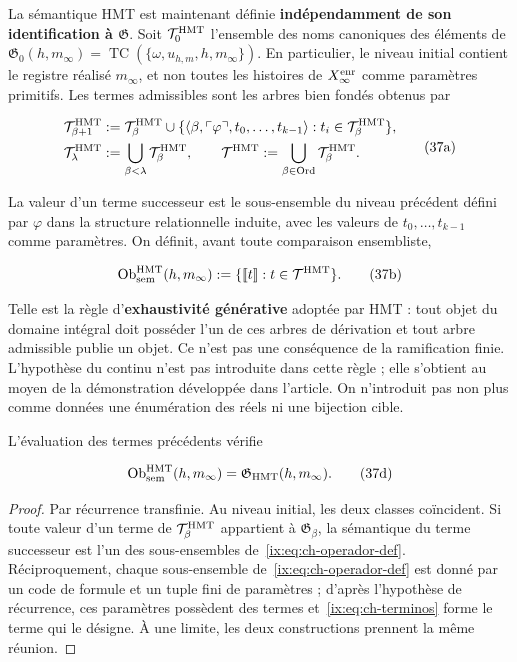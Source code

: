La sémantique HMT est maintenant définie \textbf{indépendamment de son identification à \(\mathfrak G\)}. Soit \(\mathcal T_0^{\rm HMT}\) l'ensemble des noms canoniques des éléments de \(\mathfrak G_0(h,m_\infty)=
\operatorname{TC}(\{\omega,u_{h,m},h,m_\infty\})\). En particulier, le niveau initial contient le registre réalisé \(m_\infty\), et non toutes les histoires de \(X_\infty^{\rm enr}\) comme paramètres primitifs. Les termes admissibles sont les arbres bien fondés obtenus par

\[
 \begin{aligned}
 \mathcal T^{\rm HMT}_{\beta+1}
 &:={\mathcal T}^{\rm HMT}_\beta\cup
 \{\langle\beta,\ulcorner\varphi\urcorner,
       t_0,\ldots,t_{k-1}\rangle:
       t_i\in\mathcal T^{\rm HMT}_\beta\},\\
 \mathcal T^{\rm HMT}_\lambda&:=
       \bigcup_{\beta<\lambda}\mathcal T^{\rm HMT}_\beta,
 \qquad
 \mathcal T^{\rm HMT}:=
       \bigcup_{\beta\in\operatorname{Ord}}\mathcal T^{\rm HMT}_\beta.
 \end{aligned}
\tag{37a}\label{ix:eq:ch-terminos}
\]

La valeur d’un terme successeur est le sous-ensemble du niveau précédent défini
par \(\varphi\) dans la structure relationnelle induite, avec les valeurs de
\(t_0,\ldots,t_{k-1}\) comme paramètres. On définit, avant toute
comparaison ensembliste,

\[
 \operatorname{Ob}_{\rm sem}^{\rm HMT}(h,m_\infty)
 :=\{\llbracket t\rrbracket:t\in\mathcal T^{\rm HMT}\}.
\tag{37b}\label{ix:eq:ch-objetos-semanticos}
\]

Telle est la règle d’\textbf{exhaustivité générative} adoptée par HMT : tout
objet du domaine intégral doit posséder l’un de ces arbres de dérivation et tout
arbre admissible publie un objet. Ce n’est pas une conséquence de la ramification
finie. L’hypothèse du continu n’est pas introduite dans cette règle ; elle s’obtient
au moyen de la démonstration développée dans l’article. On n’introduit pas non plus
comme données une énumération des réels ni une bijection cible.

\begin{theorem}
\label{ix:thm:ch-6a}
L’évaluation des
termes précédents vérifie

\[
 \operatorname{Ob}_{\rm sem}^{\rm HMT}(h,m_\infty)
 =\mathfrak G_{\rm HMT}(h,m_\infty).
\tag{37d}\label{ix:eq:ch-equivalencia-semantica}
\]

\end{theorem}
\begin{proof}
Par récurrence transfinie. Au niveau initial, les deux classes coïncident. Si toute valeur d'un terme de \(\mathcal T^{\rm HMT}_\beta\) appartient à \(\mathfrak G_\beta\), la sémantique du terme successeur est l'un des sous-ensembles de~\eqref{ix:eq:ch-operador-def}. Réciproquement, chaque sous-ensemble de~\eqref{ix:eq:ch-operador-def} est donné par un code de formule et un tuple fini de paramètres ; d'après l'hypothèse de récurrence, ces paramètres possèdent des termes et~\eqref{ix:eq:ch-terminos} forme le terme qui le désigne. À une limite, les deux constructions prennent la même réunion.
\end{proof}

